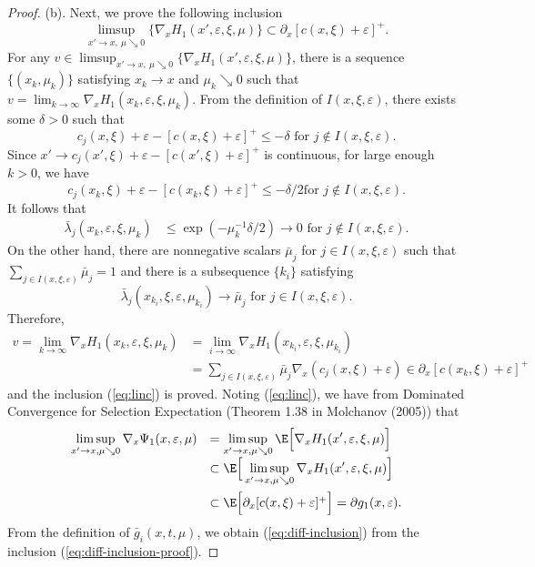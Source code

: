 \begin{proof}
(b). Next, we prove the following inclusion
\begin{equation}\label{eq:linc}
\displaystyle \limsup_{x'\rightarrow x,~ \mu\searrow
0}\Big\{\nabla_xH_1(x',\varepsilon,\xi,\mu)\Big\}\subset
\partial_x[c(x,\xi)+\varepsilon]^+.
\end{equation}
For any $v\in \displaystyle \limsup_{x'\rightarrow x,~ \mu\searrow
0}\Big\{\nabla_xH_1(x',\varepsilon,\xi,\mu)\Big\}$, there is a
sequence $\{(x_k,\mu_k)\}$ satisfying $x_k \rightarrow x$ and $\mu_k
\searrow 0$ such that $v =\displaystyle \lim_{k\rightarrow
\infty}\nabla_xH_1(x_k,\varepsilon,\xi,\mu_k)$. From the definition
of $I(x,\xi,\varepsilon)$, there exists some $\delta>0$ such that
\[c_j(x,\xi)+\varepsilon-[c(x,\xi)+\varepsilon]^+\leq -\delta
\mbox{ for } j \notin I(x,\xi,\varepsilon).\] Since $x'\rightarrow
c_j(x',\xi)+\varepsilon-[c(x',\xi)+\varepsilon]^+$ is continuous,
for large enough $k>0$, we have
\[c_j(x_k,\xi)+\varepsilon-[c(x_k,\xi)+\varepsilon]^+\leq -\delta/2 \mbox{
for } j\notin I(x,\xi,\varepsilon).\] It follows that
\[\begin{array}{ll}
\bar \lambda_j(x_k,\varepsilon,\xi,\mu_k) & \leq
\exp\left(-\mu_k^{-1}\delta/2\right)\rightarrow 0 \mbox{ for }
j\notin I(x,\xi,\varepsilon).
\end{array}\]
On the other hand, there are nonnegative scalars $\bar\mu_j$ for
$j\in I(x,\xi,\varepsilon)$ such that $\displaystyle\sum_{j\in
I(x,\xi,\varepsilon)}\bar\mu_j=1$ and there is a subsequence
$\{k_i\}$ satisfying
\[\bar \lambda_j(x_{k_i},\xi,\varepsilon,\mu_{k_i}) \rightarrow \bar\mu_j
\mbox{ for }j\in I(x,\xi,\varepsilon).\] Therefore,
\[\begin{array}{ll}
v=\displaystyle \lim_{k\rightarrow \infty}
\nabla_xH_1(x_k,\varepsilon,\xi,\mu_k)&=\displaystyle \lim_{i
\rightarrow
\infty}\nabla_xH_1(x_{k_i},\varepsilon,\xi,\mu_{k_i})\\[8pt]
&=\displaystyle\sum_{j\in I(x,\xi,\varepsilon)}\bar\mu_j\nabla_x
\left(c_j(x,\xi)+\varepsilon\right)\in\partial_x[c(x_k,\xi)+\varepsilon]^+
\end{array}\]
and the inclusion (\ref{eq:linc}) is proved. Noting (\ref{eq:linc}),
we have from Dominated Convergence for Selection Expectation
(Theorem 1.38 in Molchanov (2005)) that
\begin{equation}\label{eq:diff-inclusion-proof}
\begin{array}{ll}
\displaystyle\limsup_{x'\rightarrow x, \mu\searrow
0}\nabla_x\Psi_1(x,\varepsilon,\mu)&=\displaystyle
\limsup_{x'\rightarrow x, \mu\searrow 0}\E\Big[\nabla_xH_1(x',
\varepsilon,\xi,\mu)\Big]\\[8pt]
& \subset \E\Big [\displaystyle \limsup_{x'\rightarrow x, \mu
\searrow 0}\nabla_xH_1(x',\varepsilon,\xi,\mu)\Big]\\[12pt]
& \subset\E\Big[\partial_x[c(x,\xi)+\varepsilon]^+\Big] =\partial
g_1(x,\varepsilon).
\end{array}
\end{equation}
From the definition of $\bar g_i(x,t,\mu)$, we obtain
(\ref{eq:diff-inclusion}) from the inclusion
(\ref{eq:diff-inclusion-proof}).
\end{proof}

